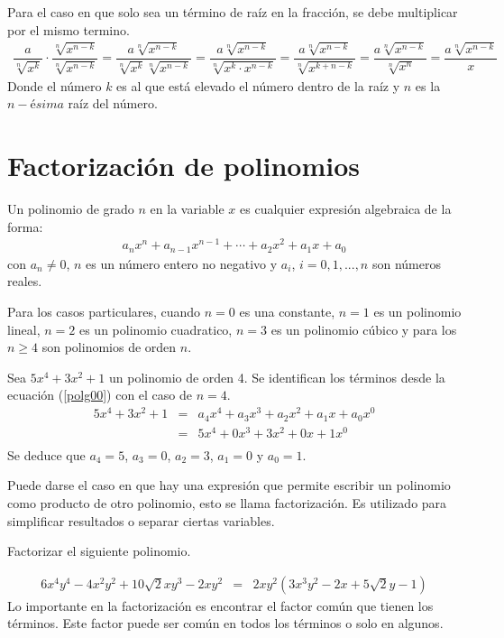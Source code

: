 Para el caso en que solo sea un término de raíz en la fracción, se debe multiplicar por el mismo termino.
\begin{eqnarray}
\dfrac{a}{\sqrt[n]{x^{k}}}\cdot\dfrac{\sqrt[n]{x^{n-k}}}{\sqrt[n]{x^{n-k}}}=\dfrac{a\sqrt[n]{x^{n-k}}}{\sqrt[n]{x^{k}}\sqrt[n]{x^{n-k}}}=\dfrac{a\sqrt[n]{x^{n-k}}}{\sqrt[n]{x^{k}\cdot x^{n-k}}}=\dfrac{a\sqrt[n]{x^{n-k}}}{\sqrt[n]{x^{k+n-k}}}=\dfrac{a\sqrt[n]{x^{n-k}}}{\sqrt[n]{x^{n}}}=\dfrac{a\sqrt[n]{x^{n-k}}}{x}
\end{eqnarray} 
Donde el número $k$ es al que está elevado el número dentro de la raíz y $n$ es la $n-$é$sima$ raíz del número.
\section{Factorización de polinomios}

\begin{mydef}
Un polinomio de grado $n$ en la variable $x$ es cualquier expresión algebraica de la forma:
\begin{eqnarray}
a_{n}x^{n}+a_{n-1}x^{n-1}+\cdots +a_{2}x^{2}+a_{1}x+a_{0}
\label{polg00}
\end{eqnarray}
con $a_{n}\neq 0$, $n$ es un número entero no negativo y $a_{i}$, $i=0,1,...,n$ son números reales.
\end{mydef}
Para los casos particulares, cuando $n=0$ es una constante, $n=1$ es un polinomio lineal, $n=2$ es un polinomio cuadratico, $n=3$ es un polinomio cúbico y para los $n\geq 4$ son polinomios de orden $n$.\\
\begin{myexample}
Sea  $5x^{4}+3x^{2}+1$ un polinomio de orden 4. Se identifican los términos desde la ecuación (\ref{polg00}) con el caso de $n=4$.
\begin{eqnarray*}
5x^{4}+3x^{2}+1&=& a_{4}x^{4}+a_{3}x^{3}+a_{2}x^{2}+a_{1}x+a_{0}x^{0}\\
&=& 5x^{4}+0x^{3}+3x^{2}+0x+1x^{0}\\
\end{eqnarray*}
Se deduce que $a_{4}=5$, $a_{3}=0$, $a_{2}=3$, $a_{1}=0$ y $a_{0}=1$.
\end{myexample}

Puede darse el caso en que hay una expresión que permite escribir un polinomio como producto de otro polinomio, esto se llama factorización. Es utilizado para simplificar resultados o separar ciertas variables. 

\begin{myexample}
Factorizar el siguiente polinomio.
\end{myexample}
\begin{eqnarray*}
6x^{4}y^{4}-4x^{2}y^{2}+10\sqrt{2}xy^{3}-2xy^{2}&=& 2xy^{2}(3x^{3}y^{2}-2x+5\sqrt{2}y-1)
\end{eqnarray*}
Lo importante en la factorización es encontrar el factor común que tienen los términos. Este factor puede ser común en todos los términos o solo en algunos.\\

